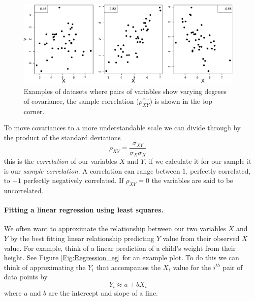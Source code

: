     \begin{figure}
 \begin{center}
   \includegraphics[width=\textwidth]{math_background/dist_pics/Covar.pdf}\end{center}
 \caption{Examples of datasets where pairs of variables show varying
   degrees of covariance, the sample correlation ($ \widehat{\rho_{XY}}$) is shown in the top corner.
   }\label{Fig:Covar_egs}
 \end{figure}
To move covariances to a more understandable scale we can divide
through by the product of the standard deviations
\begin{equation}
\rho_{XY} = \frac{{\sigma_{XY}}}{\sigma_{X} \sigma_{X}}
\end{equation}
this is the \emph{correlation} of our variables $X$ and $Y$, if we
calculate it for our sample it is our \emph{sample correlation}. A correlation can range between $1$,
perfectly correlated, to $-1$ perfectly negatively correlated. If
$\rho_{XY} =0$ the variables are said to be uncorrelated.

\paragraph{Fitting a linear regression using least squares.}
We often want to approximate the relationship between our two variables
$X$ and $Y$ by the best fitting linear relationship predicting $Y$
value from their observed $X$
value. For example, think of a linear prediction of a child's weight from their height. 
See Figure \ref{Fig:Regression_eg} for an example plot. To do this we can think of approximating the $Y_i$ that
accompanies the $X_i$ value for the $i^{th}$ pair of data points by
\begin{equation}
Y_i \approx a+ b X_i 
\end{equation}
where $a$ and $b$ are the intercept and slope of a line.

